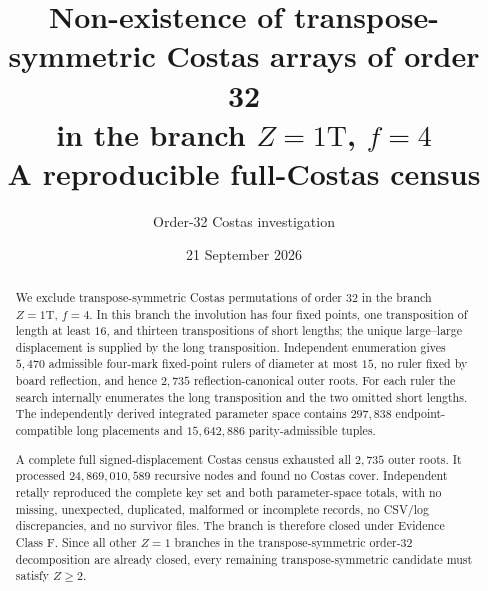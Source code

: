 \documentclass[11pt,a4paper]{article}
\title{\textbf{Non-existence of transpose-symmetric Costas arrays of order 32\\in the branch $Z=1\mathrm T$, $f=4$}\\[1ex]\large A reproducible full-Costas census}
\author{Order-32 Costas investigation}
\date{21 September 2026}
\theoremstyle{definition}\newtheorem{definition}[theorem]{Definition}\newtheorem{remark}[theorem]{Remark}
\begin{document}
\maketitle

\begin{abstract}
We exclude transpose-symmetric Costas permutations of order $32$ in the branch $Z=1\mathrm T$, $f=4$.  In this branch the involution has four fixed points, one transposition of length at least $16$, and thirteen transpositions of short lengths; the unique large--large displacement is supplied by the long transposition.  Independent enumeration gives $5{,}470$ admissible four-mark fixed-point rulers of diameter at most $15$, no ruler fixed by board reflection, and hence $2{,}735$ reflection-canonical outer roots.  For each ruler the search internally enumerates the long transposition and the two omitted short lengths.  The independently derived integrated parameter space contains $297{,}838$ endpoint-compatible long placements and $15{,}642{,}886$ parity-admissible tuples.

A complete full signed-displacement Costas census exhausted all $2{,}735$ outer roots.  It processed $24{,}869{,}010{,}589$ recursive nodes and found no Costas cover.  Independent retally reproduced the complete key set and both parameter-space totals, with no missing, unexpected, duplicated, malformed or incomplete records, no CSV/log discrepancies, and no survivor files.  The branch is therefore closed under Evidence Class F.  Since all other $Z=1$ branches in the transpose-symmetric order-$32$ decomposition are already closed, every remaining transpose-symmetric candidate must satisfy $Z\ge2$.
\end{abstract}
\end{document}
